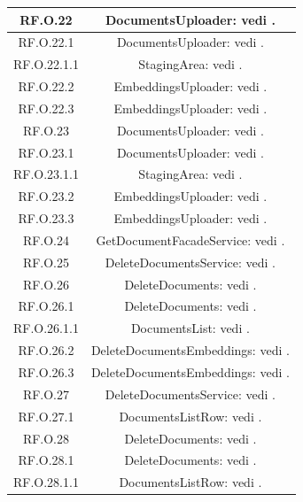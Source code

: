 \documentclass[10pt, a4paper]{article}
\begin{document}
\begin{xltabular}{\textwidth}{c|c}
\hline
RF.O.22 & DocumentsUploader: vedi .\\
\hline
RF.O.22.1 & DocumentsUploader: vedi .\\
\hline
RF.O.22.1.1 & StagingArea: vedi .\\
\hline
RF.O.22.2 & EmbeddingsUploader: vedi .\\
\hline
RF.O.22.3 & EmbeddingsUploader: vedi .\\
\hline
RF.O.23 & DocumentsUploader: vedi .\\
\hline
RF.O.23.1 & DocumentsUploader: vedi .\\
\hline
RF.O.23.1.1 & StagingArea: vedi .\\
\hline
RF.O.23.2 & EmbeddingsUploader: vedi .\\
\hline
RF.O.23.3 & EmbeddingsUploader: vedi .\\
\hline
RF.O.24 & GetDocumentFacadeService: vedi .\\
\hline
RF.O.25 & DeleteDocumentsService: vedi .\\
\hline
RF.O.26 & DeleteDocuments: vedi .\\
\hline
RF.O.26.1 & DeleteDocuments: vedi .\\
\hline
RF.O.26.1.1  & DocumentsList: vedi .\\
\hline
RF.O.26.2 & DeleteDocumentsEmbeddings: vedi .\\
\hline
RF.O.26.3 & DeleteDocumentsEmbeddings: vedi .\\
\hline
RF.O.27 & DeleteDocumentsService: vedi .\\
\hline
RF.O.27.1 &  DocumentsListRow: vedi .\\
\hline
RF.O.28 & DeleteDocuments: vedi .\\
\hline
RF.O.28.1 & DeleteDocuments: vedi .\\
\hline
RF.O.28.1.1 & DocumentsListRow: vedi . \\

\end{xltabular}
\end{document}
